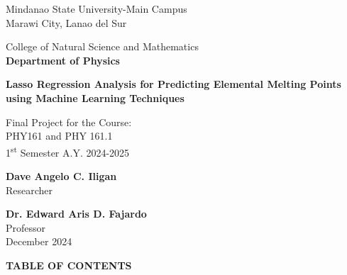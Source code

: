 \documentclass[12pt]{article}
\begin{document}
\begin{center}

Mindanao State University-Main Campus\\
Marawi City, Lanao del Sur

\vspace{3cm}

College of Natural Science and Mathematics\\
\textbf{Department of Physics}

\vspace{3cm}

\textbf{Lasso Regression Analysis for Predicting Elemental Melting Points using Machine Learning Techniques}\\

\vspace{3cm}

Final Project for the Course:\\
PHY161 and PHY 161.1\\
1\textsuperscript{st} Semester A.Y. 2024-2025

\vspace{2cm}

\textbf{Dave Angelo C. Iligan}\\
Researcher

\vspace{2cm}

\textbf{Dr. Edward Aris D. Fajardo}\\
Professor\\


December 2024\\

\end{center}

\newpage

\begin{center}
\textbf{TABLE OF CONTENTS}
\end{center}

\vspace{1cm}
\end{document}

